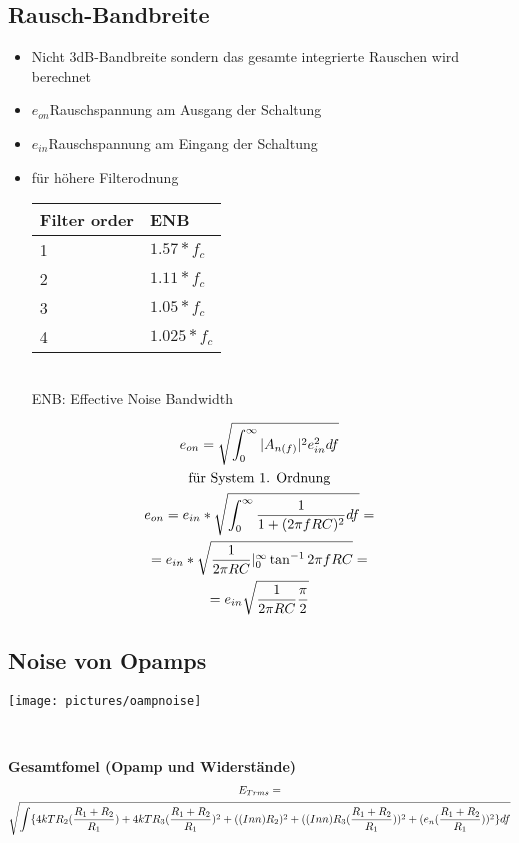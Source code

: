 \subsection{Rausch-Bandbreite}
\begin{minipage}{9cm}
\begin{itemize}
  \item Nicht 3dB-Bandbreite sondern das gesamte integrierte Rauschen wird
  berechnet
  \item $e_{on}$Rauschspannung am Ausgang der Schaltung
  \item $e_{in}$Rauschspannung am Eingang der Schaltung
  \item für höhere Filterodnung\\
  \begin{tabular}{|l|l|}
  \hline
  Filter order&ENB\\\hline
  1&$1.57*f_{c}$\\\hline
  2&$1.11*f_{c}$\\\hline
  3&$1.05*f_{c}$\\\hline
  4&$1.025*f_{c}$\\\hline
  \end{tabular}\\
  ENB: Effective Noise Bandwidth
\end{itemize}

\end{minipage}
\begin{minipage}{9cm}
\begin{gather}
e_{on}=\sqrt{\int^{\infty}_{0}|A_{n(f)}|^2e^2_{in}df}\\
\text{für System 1. Ordnung}\notag\\
e_{on}=e_{in}*\sqrt{\int^{\infty}_{0}\frac{1}{1+(2\pi
fRC)^2}df}=\notag\\=e_{in}*\sqrt{\frac{1}{2\pi
RC}|^{\infty}_0\tan^{-1}2\pi fRC}=\notag\\=e_{in}\sqrt{\frac{1}{2\pi
RC}\frac{\pi}{2}}
\end{gather}
\end{minipage}

\subsection{Noise von Opamps}
\begin{minipage}{9cm}
\texttt{[image: pictures/oampnoise]}
\end{minipage}\\
\begin{minipage}{18cm}
\textbf{Gesamtfomel (Opamp und Widerstände)}\\
\begin{gather}
E_{Trms}=\notag\\\sqrt{\int
\{4kTR_{2}(\frac{R_{1}+R_{2}}{R_{1}})+4kTR_{3}(\frac{R_{1}+R_{2}}{R_{1}})^2+((Inn)R_{2})^2+((Inn)R_{3}(\frac{R_{1}+R_{2}}{R_{1}}))^2+(e_{n}(\frac{R_{1}+R_{2}}{R_{1}}))^2\}df}
\end{gather}
\end{minipage}


